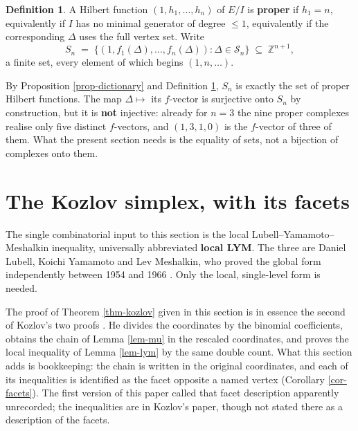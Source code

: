 \documentclass[11pt, a4paper, abstract=yes]{scrartcl}
\theoremstyle{definition}
\newtheorem{definition}{Definition}
\theoremstyle{remark}
\theoremstyle{plain}
\let\autocite\cite
\begin{document}
\begin{definition}
A Hilbert function \((1,h_1,\dots,h_n)\) of \(E/I\) is \textbf{proper} if \(h_1=n\), equivalently if \(I\)
has no minimal generator of degree \(\le1\), equivalently if the corresponding \(\Delta\) uses the
full vertex set. Write
\begin{equation}\label{eq:proper}
  S_n\;=\;\bigl\lbrace(1,f_1(\Delta),\dots,f_n(\Delta)):\Delta\in\mathcal S_n\bigr\rbrace
   \;\subseteq\;\mathbb Z^{n+1},
\end{equation}
a finite set, every element of which begins \((1,n,\dots)\).
\label{def-proper}
\end{definition}

By Proposition \ref{prop-dictionary} and Definition \ref{def-proper}, \(S_n\) is exactly the set of
proper Hilbert functions. The map \(\Delta\mapsto\) its \(f\)-vector is surjective onto \(S_n\) by
construction, but it is \textbf{not} injective: already for \(n=3\) the nine proper complexes realise only
five distinct \(f\)-vectors, and \((1,3,1,0)\) is the \(f\)-vector of three of them. What the
present section needs is the equality of sets, not a bijection of complexes onto them.
\section{The Kozlov simplex, with its facets}
\label{sec-kozlov}
The single combinatorial input to this section is the local Lubell--Yamamoto--Meshalkin inequality,
universally abbreviated \textbf{local LYM}. The three are Daniel Lubell, Koichi Yamamoto and Lev
Meshalkin, who proved the global form independently between 1954 and 1966 \autocite{Lubell1966,Meshalkin1963,Yamamoto1954}. Only the local, single-level form is needed.

The proof of Theorem \ref{thm-kozlov} given in this section is in essence the second of Kozlov's two
proofs \autocite[Section 5]{Kozlov1997}. He divides the coordinates by the binomial coefficients,
obtains the chain of Lemma \ref{lem-mu} in the rescaled coordinates, and proves the local inequality
of Lemma \ref{lem-lym} by the same double count. What this section adds is bookkeeping: the chain is
written in the original coordinates, and each of its inequalities is identified as the facet
opposite a named vertex (Corollary \ref{cor-facets}). The first version of this paper called that
facet description apparently unrecorded; the inequalities are in Kozlov's paper, though not stated
there as a description of the facets.
\end{document}
